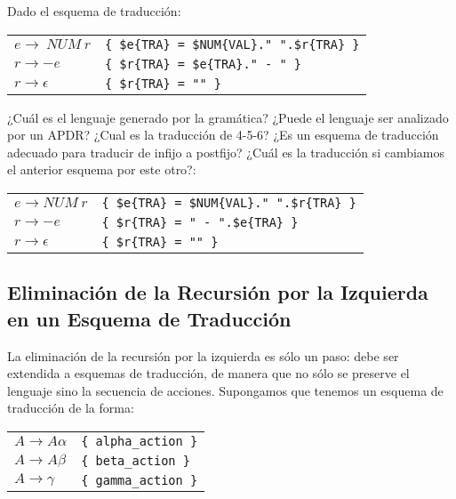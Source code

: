 \begin{exercise}
Dado el esquema de traducción:

\vspace{0.25cm}
\begin{tabular}{ll}
$e   \rightarrow\ NUM\ r$    & \verb|{ $e{TRA} = $NUM{VAL}." ".$r{TRA} }| \\
$r   \rightarrow - e$       & \verb|{ $r{TRA} = $e{TRA}." - " }|\\
$r   \rightarrow \epsilon$  & \verb|{ $r{TRA} = "" }|
\end{tabular}
\vspace{0.5cm}

¿Cuál es el lenguaje generado por la gramática? ¿Puede el lenguaje
ser analizado por un APDR?
¿Cual es la traducción de 4-5-6? ¿Es un esquema de traducción adecuado 
para traducir de infijo a postfijo?
¿Cuál es la traducción si cambiamos el anterior esquema por este otro?:

\vspace{0.25cm}
\begin{tabular}{ll}
$e   \rightarrow NUM\  r$    & \verb|{ $e{TRA} = $NUM{VAL}." ".$r{TRA} }| \\
$r   \rightarrow - e$       & \verb|{ $r{TRA} = " - ".$e{TRA} }|\\
$r   \rightarrow \epsilon$  & \verb|{ $r{TRA} = "" }|
\end{tabular}
\vspace{0.5cm}
\end{exercise}

\subsection{Eliminación de la Recursión por la Izquierda en un Esquema de Traducción}
\label{subsection:eliminarecesquem}
La eliminación de la recursión por la izquierda es sólo un paso: debe 
ser extendida a esquemas de traducción, 
de manera que no sólo se preserve el lenguaje
sino la secuencia de acciones. Supongamos que tenemos un esquema de
traducción de la forma:

\vspace{0.25cm}
\begin{tabular}{ll}
$A   \rightarrow A \alpha$  & \verb|{ alpha_action }|\\
$A   \rightarrow A \beta$   & \verb|{ beta_action }|\\
$A   \rightarrow \gamma$    & \verb|{ gamma_action }|
\end{tabular}
\vspace{0.25cm}


